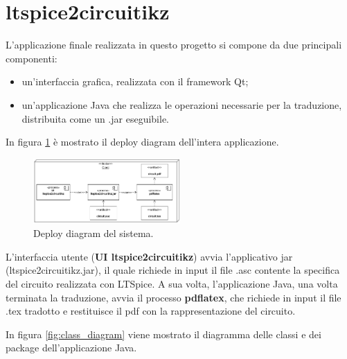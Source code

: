 \section{ltspice2circuitikz}
L'applicazione finale realizzata in questo progetto si compone da due principali componenti:
\begin{itemize}
	\item un'interfaccia grafica, realizzata con il framework Qt;
	\item un'applicazione Java che realizza le operazioni necessarie per la traduzione, distribuita come un .jar eseguibile.
\end{itemize}
In figura \ref{fig:deploy_diagram} è mostrato il deploy diagram dell'intera applicazione.
\begin{figure}[h!]
	\centering
	\includegraphics[width=0.5\textwidth]{./ImageFiles/deploy diagram.pdf}
	\caption{Deploy diagram del sistema.}
	\label{fig:deploy_diagram}
\end{figure}
L'interfaccia utente (\textbf{UI ltspice2circuitikz}) avvia l'applicativo jar (ltspice2circuitikz.jar), il quale richiede in input il file .asc contente la specifica del circuito realizzata con LTSpice. A sua volta, l'applicazione Java, una volta terminata la traduzione, avvia il processo \textbf{pdflatex}, che richiede in input il file .tex tradotto e restituisce il pdf con la rappresentazione del circuito.

\noindent
In figura \ref{fig:class_diagram} viene mostrato il diagramma delle classi e dei package dell'applicazione  Java. 

